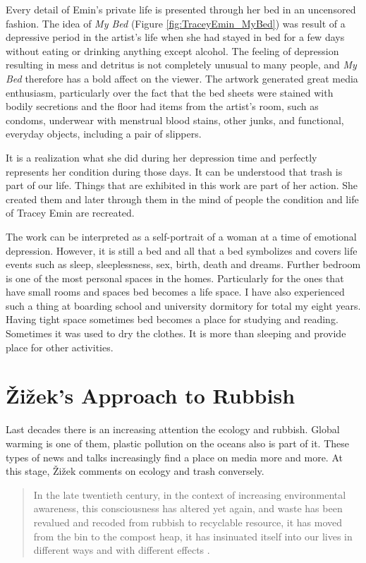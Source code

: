 Every detail of Emin’s private life is presented through her bed in an uncensored fashion. The idea of \textit{My Bed} (Figure \ref{fig:TraceyEmin_MyBed}) was result of a depressive period in the artist’s life when she had stayed in bed for a few days without eating or drinking anything except alcohol. The feeling of depression resulting in mess and detritus is not completely unusual to many people, and \textit{My Bed} therefore has a bold affect on the viewer. The artwork generated great media enthusiasm, particularly over the fact that the bed sheets were stained with bodily secretions and the floor had items from the artist’s room, such as condoms, underwear with menstrual blood stains, other junks, and functional, everyday objects, including a pair of slippers. 

It is a realization what she did during her depression time and perfectly represents her condition during those days. It can be understood that trash is part of our life. Things that are exhibited in this work are part of her action. She created them and later through them in the mind of people the condition and life of Tracey Emin are recreated.

The work can be interpreted as a self-portrait of a woman at a time of emotional depression. However, it is still a bed and all that a bed symbolizes and covers life events such as sleep, sleeplessness, sex, birth, death and dreams. Further bedroom is one of the most personal spaces in the homes. Particularly for the ones that have small rooms and spaces bed becomes a life space. I have also experienced such a thing at boarding school and university dormitory for total my eight years. Having tight space sometimes bed becomes a place for studying and reading. Sometimes it was used to dry the clothes. It is more than sleeping and provide place for other activities.



\section{Žižek’s Approach to Rubbish}
Last decades there is an increasing attention the ecology and rubbish. Global warming is one of them, plastic pollution on the oceans also is part of it. These types of news and talks increasingly find a place on media more and more. At this stage, Žižek comments on ecology and trash conversely.

\begin{quote}
In the late twentieth century, in the context of increasing environmental awareness, this consciousness has altered yet again, and waste has been revalued and recoded from rubbish to recyclable resource, it has moved from the bin to the compost heap, it has insinuated itself into our lives in different ways and with different effects \citep[5]{hawkins2005ethics}.
\end{quote}

